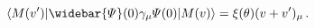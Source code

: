 \begin{equation}
\label{IsgurWise}
\langle M (v') |
\widebar {\mit\Psi} (0) \gamma_\mu {\mit\Psi} (0)
| M (v) \rangle
=
\xi ( \theta ) (v + v')_\mu
\, .
\end{equation}

